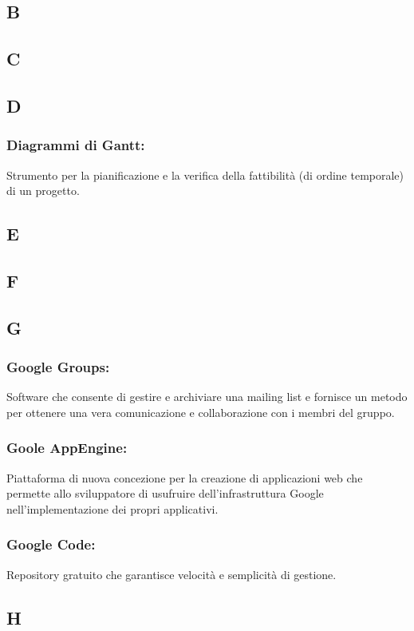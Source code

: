 \subsection*{\huge{B}}
\subsection*{\huge{C}}
\subsection*{\huge{D}}
\subsubsection*{Diagrammi di Gantt:} Strumento per la pianificazione e la
verifica della fattibilit\`a (di ordine temporale) di un progetto.
\subsection*{\huge{E}}
\subsection*{\huge{F}}
\subsection*{\huge{G}}
\subsubsection*{Google Groups:} Software che consente di gestire e archiviare
una mailing list e fornisce un metodo per ottenere una vera comunicazione e collaborazione con i membri del gruppo.

\subsubsection*{Goole AppEngine:} Piattaforma di nuova concezione per
la creazione di applicazioni web che permette allo sviluppatore di usufruire dell'infrastruttura
Google nell'implementazione dei propri applicativi.

\subsubsection*{Google Code:} Repository gratuito che garantisce
velocit\`a e semplicit\`a di gestione.

\subsection*{\huge{H}}
